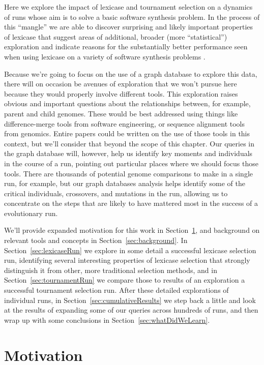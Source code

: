 Here we explore the impact of lexicase \citep{Helmuth:2015:ieeeTEC} and tournament selection 
on a dynamics of runs whose aim is to solve a basic software synthesis problem. 
In the process of this ``mangle'' we are able to discover surprising and likely important properties of
lexicase that suggest areas of additional, broader (more ``statistical'') exploration and indicate reasons
for the substantially better performance seen when using lexicase on a variety of software synthesis 
problems \citep{Helmuth:2015:GECCO}.

Because we're going to focus on the use of a graph database to explore this data, there will
on occasion be avenues of exploration that we won't pursue here because they would properly involve
different tools. This exploration raises obvious and important questions about the relationships between,
for example, parent and child genomes. These would be best addressed using things like 
difference-merge tools from software engineering, or sequence alignment tools from genomics.
Entire papers could be written on the use of those tools in this context, but we'll consider that
beyond the scope of this chapter. Our queries in the graph database will, however, help us identify key moments
and individuals in the course of a run, pointing out particular places where we should focus those tools. There are thousands
of potential genome comparisons to make in a single run, for example, but our graph databases analysis helps identify
some of the critical individuals, crossovers, and mutations in the run, allowing us to concentrate on the
steps that are likely to have mattered most in the success of a evolutionary run.

We'll provide expanded motivation for this work in Section~\ref{sec:motivation}, and background on relevant tools
and concepts in Section~\ref{sec:background}. In Section~\ref{sec:lexicaseRun} we explore in some detail a successful
lexicase selection run, identifying several interesting properties of lexicase selection that strongly distinguish it from
other, more traditional selection methods, and in Section~\ref{sec:tournamentRun} we compare those to results of 
an exploration a successful tournament selection run. After these detailed explorations of individual runs, in
Section~\ref{sec:cumulativeResults} we step back a little and look at the results of expanding some of our queries
across hundreds of runs, and then wrap up with some conclusions in Section~\ref{sec:whatDidWeLearn}.

\section{Motivation}
\label{sec:motivation}

